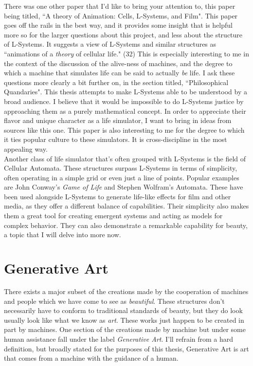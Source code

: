 \documentclass[12pt,twoside]{reedthesis}
\begin{document}
	There was one other paper that I'd like to bring your attention to, this paper being titled, ``A theory of Animation: Cells, L-Systems, and Film". This paper goes off the rails in the best way, and it provides some insight that is helpful more so for the larger questions about this project, and less about the structure of L-Systems. It suggests a view of L-Systems and similar structures as ``animations of a \textit{theory} of cellular life." (32) This is especially interesting to me in the context of the discussion of the alive-ness of machines, and the degree to which a machine that simulates life can be said to actually \textit{be} life. I ask these questions more clearly a bit further on, in the section titled, ``Philosophical Quandaries". This thesis attempts to make L-Systems able to be understood by a broad audience. I believe that it would be impossible to do L-Systems justice by approaching them as a purely mathematical concept. In order to appreciate their flavor and unique character as a life simulator, I want to bring in ideas from sources like this one. This paper is also interesting to me for the degree to which it ties popular culture to these simulators. It is cross-discipline in the most appealing way.\\
	
	Another class of life simulator that's often grouped with L-Systems is the field of Cellular Automata. These structures surpass L-Systems in terms of simplicity, often operating in a simple grid or even just a line of points. Popular examples are John Conway's \textit{Game of Life} and Stephen Wolfram's Automata. These have been used alongside L-Systems to generate life-like effects for film and other media, as they offer a different balance of capabilities. Their simplicity also makes them a great tool for creating emergent systems and acting as models for complex behavior. They can also demonstrate a remarkable capability for beauty, a topic that I will delve into more now.\\

\section{Generative Art}

	There exists a major subset of the creations made by the cooperation of machines and people which we have come to see as \textit{beautiful}. These structures don't necessarily have to conform to traditional standards of beauty, but they do look usually look like what we know as \textit{art}. These works just happen to be created in part by machines. One section of the creations made by machine but under some human assistance fall under the label \textit{Generative Art}. I'll refrain from a hard definition, but broadly stated for the purposes of this thesis, Generative Art is art that comes from a machine with the guidance of a human.\\
	
\end{document}
